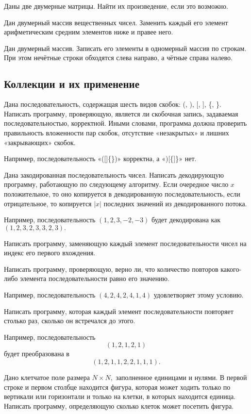 \task Даны две двумерные матрицы. Найти их произведение, если это
возможно.

\task Дан двумерный массив вещественных чисел. Заменить каждый его
элемент арифметическим средним элементов ниже и правее него.

\task Дан двумерный массив. Записать его элементы в одномерный массив
по строкам. При этом нечётные строки обходятся слева направо, а чётные
справа налево.

\subsection{Коллекции и их применение}

\task Дана последовательность, содержащая шесть видов скобок: (, ), [,
], \{, \}. Написать программу, проверяющую, является ли скобочная
запись, задаваемая последовательностью, корректной. Иными словами,
программа должна проверить правильность вложенности пар скобок,
отсутствие «незакрытых» и лишних «закрывающих» скобок.

Например, последовательность «([]\{\})» корректна, а «)[\{]\}» нет.

\task Дана закодированная последовательность чисел. Написать
декодирующую программу, работающую по следующему алгоритму. Если
очередное число $x$ положительное, то оно копируется в декодированную
последовательность, если отрицательное, то копируется $|x|$ последних
значений из декодированного потока.

Например, последовательность $(1, 2, 3, -2, -3)$ будет декодирована как
$(1, 2, 3, 2, 3, 3, 2, 3).$

\task Написать программу, заменяющую каждый элемент последовательности
чисел на индекс его первого вхождения.

\task Написать программу, проверяющую, верно ли, что количество
повторов какого-либо элемента последовательности равно его значению.

Например, последовательность $(4, 2, 4, 2, 4, 1, 4)$ удовлетворяет
этому условию.

\task Написать программу, которая каждый элемент последовательности
повторяет столько раз, сколько он встречался до этого.

Например, последовательность
\[
(1, 2, 1, 2, 1)
\]
будет преобразована в 
\[
(1, 2, 1, 1, 2, 2, 1, 1, 1).
\]

\task Дано клетчатое поле размера $N\times N,$ заполненное единицами и
нулями. В первой строке и первом столбце находится фигура, которая
может ходить только по вертикали или горизонтали и только на клетки, в
которых находится единица. Написать программу, определяющую сколько
клеток может посетить фигура.

